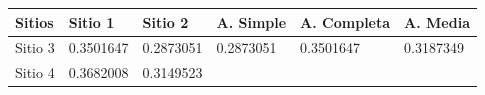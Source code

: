 \documentclass[]{book}
\begin{document}
\begin{longtable}[]{@{}llllll@{}}
\toprule
\begin{minipage}[b]{0.12\columnwidth}\raggedright\strut
Sitios\strut
\end{minipage} & \begin{minipage}[b]{0.14\columnwidth}\raggedright\strut
Sitio 1\strut
\end{minipage} & \begin{minipage}[b]{0.12\columnwidth}\raggedright\strut
Sitio 2\strut
\end{minipage} & \begin{minipage}[b]{0.15\columnwidth}\raggedright\strut
A. Simple\strut
\end{minipage} & \begin{minipage}[b]{0.17\columnwidth}\raggedright\strut
A. Completa\strut
\end{minipage} & \begin{minipage}[b]{0.14\columnwidth}\raggedright\strut
A. Media\strut
\end{minipage}\tabularnewline
\midrule
\endhead
\begin{minipage}[t]{0.12\columnwidth}\raggedright\strut
Sitio 3\strut
\end{minipage} & \begin{minipage}[t]{0.14\columnwidth}\raggedright\strut
0.3501647\strut
\end{minipage} & \begin{minipage}[t]{0.12\columnwidth}\raggedright\strut
0.2873051\strut
\end{minipage} & \begin{minipage}[t]{0.15\columnwidth}\raggedright\strut
0.2873051\strut
\end{minipage} & \begin{minipage}[t]{0.17\columnwidth}\raggedright\strut
0.3501647\strut
\end{minipage} & \begin{minipage}[t]{0.14\columnwidth}\raggedright\strut
0.3187349\strut
\end{minipage}\tabularnewline
\begin{minipage}[t]{0.12\columnwidth}\raggedright\strut
Sitio 4\strut
\end{minipage} & \begin{minipage}[t]{0.14\columnwidth}\raggedright\strut
0.3682008\strut
\end{minipage} & \begin{minipage}[t]{0.12\columnwidth}\raggedright\strut
0.3149523\strut
\end{minipage} & \begin{minipage}[t]{0.15\columnwidth}\raggedright\strut

\end{minipage}
\end{longtable}
\end{document}
